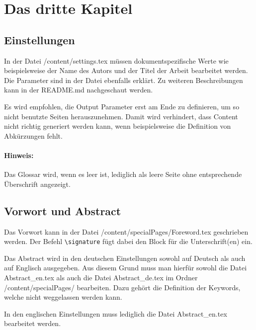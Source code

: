 \chapter{Das dritte Kapitel}

\section{Einstellungen}
In der Datei /content/settings.tex müssen dokumentspezifische Werte wie beispielsweise der Name des Autors und der Titel der Arbeit bearbeitet werden. Die Parameter sind in der Datei ebenfalls erklärt. Zu weiteren Beschreibungen kann in der README.md nachgeschaut werden.

Es wird empfohlen, die Output Parameter erst am Ende zu definieren, um so nicht benutzte Seiten herauszunehmen. Damit wird verhindert, dass Content nicht richtig generiert werden kann, wenn beispielsweise die Definition von Abkürzungen fehlt.

\subsubsection{Hinweis:}
Das Glossar wird, wenn es leer ist, lediglich als leere Seite ohne entsprechende Überschrift angezeigt.


\section{Vorwort und Abstract}
Das Vorwort kann in der Datei /content/specialPages/Foreword.tex geschrieben werden. Der Befehl \texttt{\textbackslash{}signature} fügt dabei den Block für die Unterschrift(en) ein.

Das Abstract wird in den deutschen Einstellungen sowohl auf Deutsch als auch auf Englisch ausgegeben. Aus diesem Grund muss man hierfür sowohl die Datei Abstract\_en.tex als auch die Datei Abstract\_de.tex im Ordner /content/specialPages/ bearbeiten. Dazu gehört die Definition der Keywords, welche nicht weggelassen werden kann.

In den englischen Einstellungen muss lediglich die Datei Abstract\_en.tex bearbeitet werden.